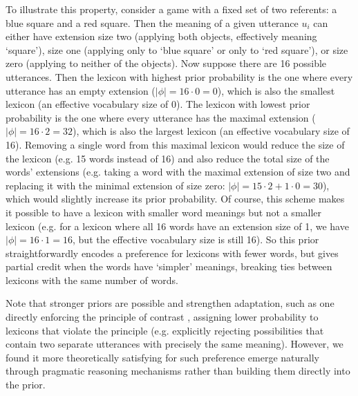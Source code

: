 \documentclass[10pt, man, floatsintext]{apa7}
\begin{document}
To illustrate this property, consider a game with a fixed set of two referents: a blue square and a red square. Then the meaning of a given utterance $u_i$ can either have extension size two (applying both objects, effectively meaning ‘square’), size one (applying only to ‘blue square’ or only to ‘red square’), or size zero (applying to neither of the objects). Now suppose there are 16 possible utterances. Then the lexicon with highest prior probability is the one where every utterance has an empty extension ($|\phi| = 16 \cdot 0 = 0$), which is also the smallest lexicon (an effective vocabulary size of 0). The lexicon with lowest prior probability is the one where every utterance has the maximal extension ($|\phi| = 16 \cdot 2 = 32$), which is also the largest lexicon (an effective vocabulary size of 16). Removing a single word from this maximal lexicon would reduce the size of the lexicon (e.g. 15 words instead of 16) and also reduce the total size of the words' extensions (e.g. taking a word with the maximal extension of size two and replacing it with the minimal extension of size zero: $|\phi| = 15 \cdot 2 + 1 \cdot 0 = 30$), which would slightly increase its prior probability. Of course, this scheme makes it possible to have a lexicon with smaller word meanings but not a smaller lexicon (e.g. for a lexicon where all 16 words have an extension size of 1, we have $|\phi| = 16 \cdot 1 = 16$, but the effective vocabulary size is still 16). So this prior straightforwardly encodes a preference for lexicons with fewer words, but gives partial credit when the words have ‘simpler’ meanings, breaking ties between lexicons with the same number of words.

Note that stronger priors are possible and strengthen adaptation, such as one directly enforcing the principle of contrast \cite{clark1987principle}, assigning lower probability to lexicons that violate the principle (e.g. explicitly rejecting possibilities that contain two separate utterances with precisely the same meaning). However, we found it more theoretically satisfying for such preference emerge naturally through pragmatic reasoning mechanisms rather than building them directly into the prior. 
\end{document}
